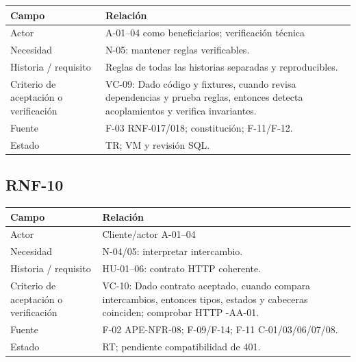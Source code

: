\documentclass[12pt,a4paper]{report}
\begin{document}
{\def\LTcaptype{none} %
\begin{longtable}[]{@{}
  >{\raggedright\arraybackslash}p{}
  >{\raggedright\arraybackslash}p{}@{}}
\toprule\noalign{}
\begin{minipage}[b]{\linewidth}\raggedright
Campo
\end{minipage} & \begin{minipage}[b]{\linewidth}\raggedright
Relación
\end{minipage} \\
\midrule\noalign{}
\endhead
\bottomrule\noalign{}
\endlastfoot
Actor & A-01--04 como beneficiarios; verificación técnica \\
Necesidad & N-05: mantener reglas verificables. \\
Historia / requisito & Reglas de todas las historias separadas y
reproducibles. \\
Criterio de aceptación o verificación & VC-09: Dado código y
fixtures, cuando revisa dependencias y prueba reglas, entonces detecta
acoplamientos y verifica invariantes. \\
Fuente & F-03 RNF-017/018; constitución; F-11/F-12. \\
Estado & TR; VM y revisión SQL. \\
\end{longtable}
}

\subsection{RNF-10}\label{matriz-RNF-10}

{\def\LTcaptype{none} %
\begin{longtable}[]{@{}
  >{\raggedright\arraybackslash}p{}
  >{\raggedright\arraybackslash}p{}@{}}
\toprule\noalign{}
\begin{minipage}[b]{\linewidth}\raggedright
Campo
\end{minipage} & \begin{minipage}[b]{\linewidth}\raggedright
Relación
\end{minipage} \\
\midrule\noalign{}
\endhead
\bottomrule\noalign{}
\endlastfoot
Actor & Cliente/actor A-01--04 \\
Necesidad & N-04/05: interpretar intercambio. \\
Historia / requisito & HU-01--06: contrato HTTP coherente. \\
Criterio de aceptación o verificación & VC-10: Dado contrato
aceptado, cuando compara intercambios, entonces tipos, estados y
cabeceras coinciden; comprobar HTTP -AA-01. \\
Fuente & F-02 APE-NFR-08; F-09/F-14; F-11 C-01/03/06/07/08. \\
Estado & RT; pendiente compatibilidad de 401. \\
\end{longtable}
}
\end{document}
